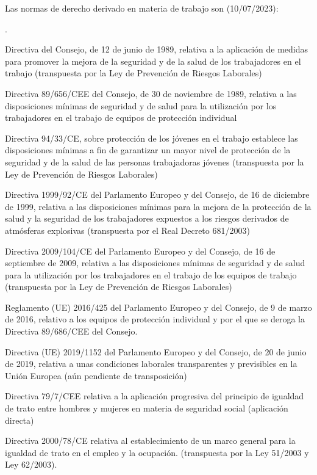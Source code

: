\documentclass[10pt,a4paper]{article}
\newcounter{numitem}
\newenvironment{lnum}
      {\begin{list}{\arabic{numitem}.}{%
          \usecounter{numitem}%
          \setlength{\leftmargin}{1cm}%
          \setlength{\parskip}{3pt}%
          \setlength{\itemsep}{0pt}%
          \setlength{\parsep}{0pt}%
      }}
      {\end{list}}
\begin{document}
Las normas de derecho derivado en materia de trabajo son (\textcolor{yellos}{10/07/2023}):
\begin{lnum}
    \item Directiva del Consejo, de 12 de junio de 1989, relativa a la aplicación de medidas para promover la mejora de la seguridad y de la salud de los trabajadores en el trabajo (transpuesta por la Ley de Prevención de Riesgos Laborales)
    \item Directiva 89/656/CEE del Consejo, de 30 de noviembre de 1989, relativa a las disposiciones mínimas de seguridad y de salud para la utilización por los trabajadores en el trabajo de equipos de protección individual
    \item Directiva 94/33/CE, sobre protección de los jóvenes en el trabajo establece las disposiciones mínimas a fin de garantizar un mayor nivel de protección de la seguridad y de la salud de las personas trabajadoras jóvenes (transpuesta por la Ley de Prevención de Riesgos Laborales)
    \item Directiva 1999/92/CE del Parlamento Europeo y del Consejo, de 16 de diciembre de 1999, relativa a las disposiciones mínimas para la mejora de la protección de la salud y la seguridad de los trabajadores expuestos a los riesgos derivados de atmósferas explosivas (transpuesta por el Real Decreto 681/2003)
    \item Directiva 2009/104/CE del Parlamento Europeo y del Consejo, de 16 de septiembre de 2009, relativa a las disposiciones mínimas de seguridad y de salud para la utilización por los trabajadores en el trabajo de los equipos de trabajo (transpuesta por la Ley de Prevención de Riesgos Laborales)
    \item Reglamento (UE) 2016/425 del Parlamento Europeo y del Consejo, de 9 de marzo de 2016, relativo a los equipos de protección individual y por el que se deroga la Directiva 89/686/CEE del Consejo.
    \item Directiva (UE) 2019/1152 del Parlamento Europeo y del Consejo, de 20 de junio de 2019, relativa a unas condiciones laborales transparentes y previsibles en la Unión Europea (aún pendiente de transposición)
    \item Directiva 79/7/CEE relativa a la aplicación progresiva del principio de igualdad de trato entre hombres y mujeres en materia de seguridad social (aplicación directa)
    \item Directiva 2000/78/CE relativa al establecimiento de un marco general para la igualdad de trato en el empleo y la ocupación. (transpuesta por la Ley 51/2003 y Ley 62/2003).

\end{lnum}
\end{document}
